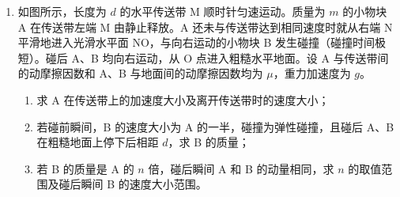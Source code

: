 \documentclass[\gkver]{gaokaozhenti}
\begin{document}
\begin{enumerate}
{

由于 K 从水平方向逆时针旋转 $60^\circ$，则 $\theta = 30^\circ$，根据几何关系可知此时粒子做匀速圆周运动的半径为 $r_{1} = 2h$

$qv_{1}B = \frac{mv_{1}^{2}}{r_{1}}$

解得 $v_{1} = \frac{qBr_{1}}{m} = \frac{2qBh}{m}$

（3）由题意带正电粒子恰好在 M 点产生光点，则关闭磁场时粒子速度恰好指向 M，过 M 点做正电粒子轨迹的切线，切点为 P，如图


根据前面解析可知 $ON = \sqrt{3}h$，所以 $NM = 2\sqrt{3}h$

由于 $O'N = r_{1} = 2h$，且 $O'N \perp NM$

根据几何关系可知 $\angle NO'M = \angle PO'M = 60^\circ$，而 $\angle KO'N = 120^\circ$

所以 $\alpha = 120^\circ$

粒子在磁场中运动的周期 $T = \frac{2\pi m}{qB}$，对应的圆心角 $\alpha = 120^\circ$

所以 $t = \frac{1}{3}T = \frac{1}{3}\cdot\frac{2\pi m}{qB} = \frac{2\pi m}{3qB}$。
}

\item
如图所示，长度为 $d$ 的水平传送带 M 顺时针匀速运动。质量为 $m$ 的小物块 A 在传送带左端 M 由静止释放。A 还未与传送带达到相同速度时就从右端 N 平滑地进入光滑水平面 NO，与向右运动的小物块 B 发生碰撞（碰撞时间极短）。碰后 A、B 均向右运动，从 O 点进入粗糙水平地面。设 A 与传送带间的动摩擦因数和 A、B 与地面间的动摩擦因数均为 $\mu$，重力加速度为 $g$。
\begin{enumerate}
	\item
	求 A 在传送带上的加速度大小及离开传送带时的速度大小；
	\item
	若碰前瞬间，B 的速度大小为 A 的一半，碰撞为弹性碰撞，且碰后 A、B 在粗糙地面上停下后相距 $d$，求 B 的质量；
	\item
	若 B 的质量是 A 的 $n$ 倍，碰后瞬间 A 和 B 的动量相同，求 $n$ 的取值范围及碰后瞬间 B 的速度大小范围。
\end{enumerate}


\end{enumerate}
\end{document}
